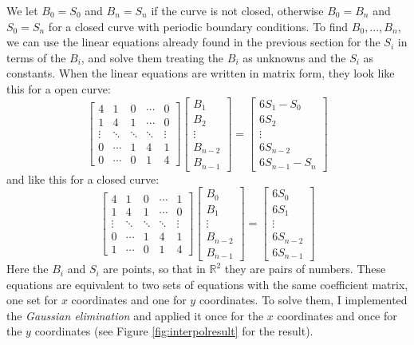 \documentclass[]{usiinfbachelorproject}
\begin{document}
\noindent We let $B_0 = S_0$ and $B_n = S_n$ if the curve is not closed, otherwise $B_0 = B_n$ and $S_0 = S_n$ for a closed curve with periodic boundary conditions. To find $B_0, ...,B_n$, we can use the linear equations already found in the previous section for the $S_i$ in terms of the $B_i$, and solve them treating the $B_i$ as unknowns and the $S_i$ as constants. When the linear equations are written in matrix form, they look like this for a open curve:
\[\begin{bmatrix} 
	4 & 1 & 0 & \cdots & 0\\
	1 & 4 & 1 & \cdots & 0\\
	\vdots & \ddots & \ddots & \ddots & \vdots\\
	0 & \cdots & 1 & 4 & 1 \\
	0 & \cdots & 0 & 1 & 4 
\end{bmatrix}
\left[ \begin{array}{c} 
	B_1 \\
	B_2 \\
	\vdots \\
	B_{n-2} \\ 
	B_{n-1} 
\end{array} \right] =  
\left[ \begin{array}{c} 
	6S_1 - S_0 \\
	6S_2 \\
	\vdots \\
	6S_{n-2} \\
	6S_{n-1} - S_n
\end{array} \right]\]
and like this for a closed curve:
\[\begin{bmatrix} 
	4 & 1 & 0 & \cdots & 1\\
	1 & 4 & 1 & \cdots & 0\\
	\vdots & \ddots & \ddots & \ddots & \vdots\\
	0 & \cdots & 1 & 4 & 1 \\
	1 & \cdots & 0 & 1 & 4 
\end{bmatrix}
\left[ \begin{array}{c} 
	B_0 \\
	B_1 \\
	\vdots \\
	B_{n-2} \\ 
	B_{n-1} 
\end{array} \right] =  
\left[ \begin{array}{c} 
	6S_0 \\
	6S_1 \\
	\vdots \\
	6S_{n-2} \\
	6S_{n-1}
\end{array} \right]\]
Here the $B_i$ and $S_i$ are points, so that in $\mathbb{R}^2$ they are pairs of numbers. These equations are equivalent to two sets of equations with the same coefficient matrix, one set for $x$ coordinates and one for $y$ coordinates. To solve them, I implemented the \emph{Gaussian elimination} and applied it once for the $x$ coordinates and once for the $y$ coordinates (see Figure \ref{fig:interpolresult} for the result).\\
\end{document}
